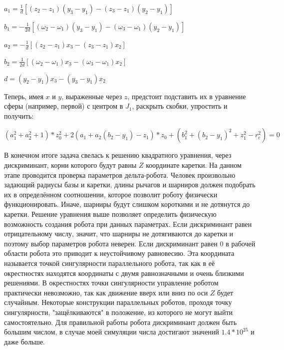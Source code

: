\vspace{0.5cm}
\hspace{4cm} $a_{1} =\frac{1}{d}[(z_{2}-z_{1})(y_{3}-y_{1})-(z_{3}-z_{1})(y_{2}-y_{1})]$

\hspace{4cm} $b_{1} =-\frac{1}{2d}[(\omega_{2}-\omega_{1})(y_{3}-y_{1})-(\omega_{3}-\omega_{1})(y_{2}-y_{1})]$\\
\vspace{0.5cm}

\hspace{4cm} $a_{2} =-\frac{1}{d}[(z_{2}-z_{1})x_{3}-(z_{3}-z_{1})x_{2}]$

\hspace{4cm} $b_{2} =\frac{1}{2d}[(\omega_{2}-\omega_{1})x_{3}-(\omega_{3}-\omega_{1})x_{2}]$

\vspace{0.5cm}
\hspace{4cm} $d=(y_{2}-y_{1})x_{3} - (y_{3}-y_{1})x_{2}$\\
\vspace{0.75cm}

Теперь, имея $x$ и $y$, выраженные через $z$, предстоит подставить их в уравнение сферы (например, первой) с центром в $J_{1}$, раскрыть скобки, упростить и получить:

\begin{center}
    $(a^{2}_{1}+a^{2}_{2}+1)*z^{2}_{0} + 2(a_{1}+a_{2}(b_{2}-y_{1})-z_{1})*z_{0} +(b^{2}_{1}+(b_{2}-y_{1})^2 +z^{2}_{1}-r^{2}_{e})=0$
\end{center}

В конечном итоге задача свелась к решению квадратного уравнения, через дискриминант, корни которого будут равны $Z$ координате каретки. На данном этапе проводится проверка параметров дельта-робота. Человек произвольно задающий радиусы базы и каретки, длины рычагов и шарниров должен подобрать их в определённом соотношении, которое позволит роботу физически функционировать. Иначе, шарниры будут слишком короткими и не дотянутся до каретки. Решение уравнения выше позволяет определить физическую возможность создания робота при данных параметрах. Если дискриминант равен отрицательному числу, значит, что шарниры не дотягиваются до каретки и поэтому выбор параметров робота неверен. Если дискриминант равен 0 в рабочей области робота это приводит к неустойчивому равновесию. Эта координата называется точкой сингулярности параллельного робота, так как в её окрестностях находятся координаты с двумя равнозначными и очень близкими решениями. В окрестностях точки сингулярности управление роботом практически невозможно, так как движение вверх или вниз по оси $Z$ будет случайным. Некоторые конструкции параллельных роботов, проходя точку сингулярности, "защёлкиваются" в положение, из которого не могут выйти самостоятельно. Для правильной работы робота дискриминант должен быть большим числом, в случае моей симуляции числа достигают значений $1.4*10^{25}$ и даже больше.

